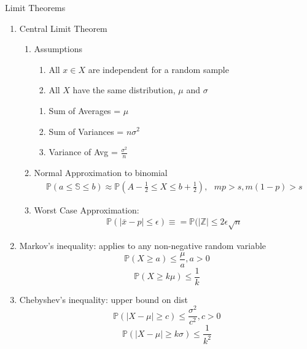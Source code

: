 \documentclass[12pt]{article}
\newcommand{\abs}[1]{\left| #1 \right|} %
\renewcommand{\=}[1]{\stackrel{#1}{=}} %
\theoremstyle{definition}
\theoremstyle{remark}
\begin{document}
Limit Theorems
\begin{enumerate}
\item Central Limit Theorem
  \begin{enumerate}
  \item Assumptions
    \begin{enumerate}
    \item All $x \in X$ are independent for a random sample
    \item All $X$ have the same distribution, $\mu$ and $\sigma$
    \end{enumerate}
    \begin{enumerate}
    \item Sum of Averages = $\mu$
    \item Sum of Variances = $n\sigma^2$
    \item Variance of Avg = $\frac{\sigma^2}{n}$
    \end{enumerate}
  \item Normal Approximation to binomial
        \begin{align*}
      \mathbb{P}(a \leq \mathbb{S} \leq b) \approx
      \mathbb{P}(A-\frac{1}{2} \leq X \leq b + \frac{1}{2}),\textrm{ } mp > s, m(1-p)>s
    \end{align*}
  \item Worst Case Approximation:
    \begin{align*}
      \mathbb{P}(\abs{\bar{x}-p} \leq \epsilon) \equiv =
      \mathbb{P}(\abs{\mathbb{Z}} \leq 2\epsilon\sqrt{n}
    \end{align*}
  \end{enumerate}
\item Markov's inequality: applies to any non-negative random variable
  \begin{equation}
    \mathbb{P}(X \geq a) \leq \frac{\mu}{a} , a >0
  \end{equation}
  \begin{equation}
    \mathbb{P}(X \geq k\mu) \leq \frac{1}{k}
  \end{equation}
\item Chebyshev's inequality: upper bound on dist
  \begin{equation}
    \mathbb{P}(\abs{X-\mu} \geq c) \leq \frac{\sigma^2}{c^2}, c>0
  \end{equation}
  \begin{equation}
    \mathbb{P}(\abs{X-\mu} \geq k\sigma) \leq \frac{1}{k^2}
  \end{equation}
\end{enumerate}
\end{document}
